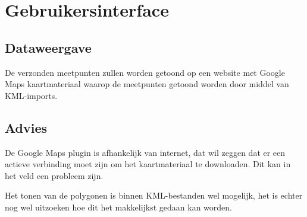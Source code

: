 \section{Gebruikersinterface}
\subsection{Dataweergave}
De verzonden meetpunten zullen worden getoond op een website met Google Maps
kaartmateriaal waarop de meetpunten getoond worden door middel van KML-imports.

\subsection{Advies}
De Google Maps plugin is afhankelijk van internet, dat wil zeggen dat er een actieve
verbinding moet zijn om het kaartmateriaal te downloaden. Dit kan in het veld een
probleem zijn.

Het tonen van de polygonen is binnen KML-bestanden wel mogelijk, het is echter nog
wel uitzoeken hoe dit het makkelijkst gedaan kan worden.

